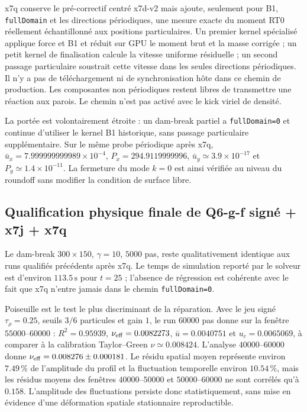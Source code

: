 \documentclass[11pt,a4paper]{article}
\begin{document}
x7q conserve le pré-correctif centré x7d-v2 mais ajoute, seulement pour B1, \texttt{fullDomain} et les directions périodiques, une mesure exacte du moment RT0 réellement échantillonné aux positions particulaires. Un premier kernel spécialisé applique force et B1 et réduit sur GPU le moment brut et la masse corrigée ; un petit kernel de finalisation calcule la vitesse uniforme résiduelle ; un second passage particulaire soustrait cette vitesse dans les seules directions périodiques. Il n'y a pas de téléchargement ni de synchronisation hôte dans ce chemin de production. Les composantes non périodiques restent libres de transmettre une réaction aux parois. Le chemin n'est pas activé avec le kick viriel de densité.

La portée est volontairement étroite : un dam-break partiel a \texttt{fullDomain=0} et continue d'utiliser le kernel B1 historique, sans passage particulaire supplémentaire. Sur le même probe périodique après x7q, $\bar u_x=7.999999999989\times10^{-4}$, $P_x=294.9119999996$, $\bar u_y\simeq3.9\times10^{-17}$ et $P_y\simeq1.4\times10^{-11}$. La fermeture du mode $k=0$ est ainsi vérifiée au niveau du roundoff sans modifier la condition de surface libre.

\subsection{Qualification physique finale de Q6-g-f signé + x7j + x7q}

Le dam-break $300\times150$, $\gamma=10$, $5000$ pas, reste qualitativement identique aux runs qualifiés précédents après x7q. Le temps de simulation reporté par le solveur est d'environ $113.5\,\mathrm{s}$ pour $t=25$ ; l'absence de régression est cohérente avec le fait que x7q n'entre jamais dans le chemin \texttt{fullDomain=0}.

Poiseuille est le test le plus discriminant de la réparation. Avec le jeu signé $\tau_\rho=0.25$, seuils $3/6$ particules et gain $1$, le run $60000$ pas donne sur la fenêtre $55000$--$60000$ : $R^2=0.95939$, $\nu_{\rm eff}=0.0082273$, $\bar u=0.0040751$ et $u_c=0.0065069$, à comparer à la calibration Taylor--Green $\nu\simeq0.008424$. L'analyse $40000$--$60000$ donne $\nu_{\rm eff}=0.008276\pm0.000181$. Le résidu spatial moyen représente environ $7.49\,\%$ de l'amplitude du profil et la fluctuation temporelle environ $10.54\,\%$, mais les résidus moyens des fenêtres $40000$--$50000$ et $50000$--$60000$ ne sont corrélés qu'à $0.158$. L'amplitude des fluctuations persiste donc statistiquement, sans mise en évidence d'une déformation spatiale stationnaire reproductible.
\end{document}

